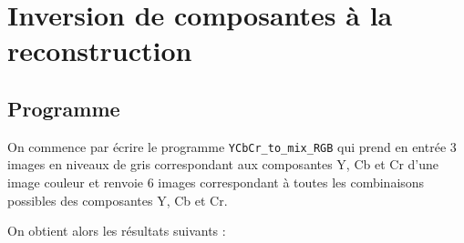 \documentclass[french,a4paper,10pt]{article}
\begin{document}
    \newpage
    \section{Inversion de composantes à la reconstruction}\label{sec:4}

    \subsection{Programme}\label{subsec:4.1}

    On commence par écrire le programme \texttt{YCbCr\_to\_mix\_RGB} qui
    prend en entrée 3 images en niveaux de gris correspondant aux composantes Y,
    Cb et Cr d'une image couleur et renvoie 6 images correspondant à toutes les
    combinaisons possibles des composantes Y, Cb et Cr.

    On obtient alors les résultats suivants :
\end{document}
